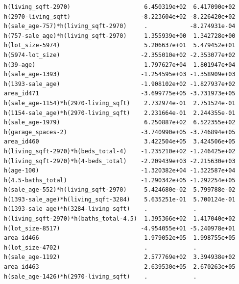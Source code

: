 \documentclass[
]{article}
\begin{document}
\begin{verbatim}
h(living_sqft-2970)                     6.450319e+02  6.417090e+02
h(2970-living_sqft)                    -8.223604e+02 -8.226420e+02
h(sale_age-757)*h(living_sqft-2970)     .            -8.274931e-04
h(757-sale_age)*h(living_sqft-2970)     1.355939e+00  1.342728e+00
h(lot_size-5974)                        5.206637e+01  5.479452e+01
h(5974-lot_size)                       -2.355010e+02 -2.353077e+02
h(39-age)                               1.797627e+04  1.801947e+04
h(sale_age-1393)                       -1.254595e+03 -1.358909e+03
h(1393-sale_age)                       -1.908102e+02 -1.827937e+02
area_id471                             -3.699775e+05 -3.731973e+05
h(sale_age-1154)*h(2970-living_sqft)    2.732974e-01  2.751524e-01
h(1154-sale_age)*h(2970-living_sqft)    2.231664e-01  2.244355e-01
h(sale_age-1979)                        6.250887e+02  6.522355e+02
h(garage_spaces-2)                     -3.740990e+05 -3.746894e+05
area_id460                              3.422504e+05  3.424506e+05
h(living_sqft-2970)*h(beds_total-4)    -1.235210e+02 -1.246425e+02
h(living_sqft-2970)*h(4-beds_total)    -2.209439e+03 -2.215630e+03
h(age-100)                             -1.320382e+04 -1.322587e+04
h(4.5-baths_total)                     -1.290342e+05 -1.292254e+05
h(sale_age-552)*h(living_sqft-2970)     5.424680e-02  5.799788e-02
h(1393-sale_age)*h(living_sqft-3284)    5.635251e-01  5.700124e-01
h(1393-sale_age)*h(3284-living_sqft)    .             .           
h(living_sqft-2970)*h(baths_total-4.5)  1.395366e+02  1.417040e+02
h(lot_size-8517)                       -4.954055e+01 -5.240978e+01
area_id466                              1.979052e+05  1.998755e+05
h(lot_size-4702)                        .             .           
h(sale_age-1192)                        2.577769e+02  3.394938e+02
area_id463                              2.639530e+05  2.670263e+05
h(sale_age-1426)*h(2970-living_sqft)    .             .           
                                                                  

\end{verbatim}
\end{document}
